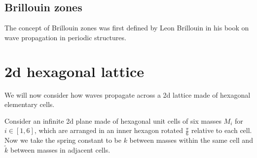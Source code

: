 \subsection{Brillouin zones}
\label{brizones}
The concept of Brillouin zones was first defined by Leon Brillouin in his book
on wave propagation in periodic structures.\cite{brillouin}

\section{2d hexagonal lattice}
We will now consider how waves propagate across a 2d lattice made of hexagonal elementary cells. 

Consider an infinite 2d plane made of hexagonal unit cells of six masses $M_i$
for $i\in\left[1,6\right]$, which are arranged in an inner hexagon rotated
$\frac{\pi}{6}$ relative to each cell. Now we take the spring constant to be $k$
between masses within the same cell and $\tilde{k}$ between masses in adjacent
cells.

